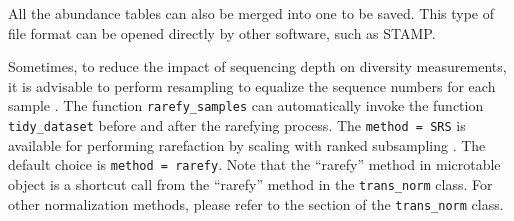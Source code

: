 \documentclass[
]{book}
\newenvironment{Shaded}{\begin{snugshade}}{\end{snugshade}}
\newcommand{\AttributeTok}[1]{\textcolor[rgb]{0.13,0.29,0.53}{#1}}
\newcommand{\CommentTok}[1]{\textcolor[rgb]{0.56,0.35,0.01}{\textit{#1}}}
\newcommand{\ConstantTok}[1]{\textcolor[rgb]{0.56,0.35,0.01}{#1}}
\newcommand{\FunctionTok}[1]{\textcolor[rgb]{0.13,0.29,0.53}{\textbf{#1}}}
\newcommand{\NormalTok}[1]{#1}
\newcommand{\OtherTok}[1]{\textcolor[rgb]{0.56,0.35,0.01}{#1}}
\newcommand{\SpecialCharTok}[1]{\textcolor[rgb]{0.81,0.36,0.00}{\textbf{#1}}}
\newcommand{\StringTok}[1]{\textcolor[rgb]{0.31,0.60,0.02}{#1}}
\begin{document}
All the abundance tables can also be merged into one to be saved.
This type of file format can be opened directly by other software, such as STAMP.

\begin{Shaded}
\end{Shaded}

Sometimes, to reduce the impact of sequencing depth on diversity measurements,
it is advisable to perform resampling to equalize the sequence numbers for each sample \citep{McKnight_Methodsnorm_2018}.
The function \texttt{rarefy\_samples} can automatically invoke the function \texttt{tidy\_dataset} before and after the rarefying process.
The \texttt{method\ =\ \textquotesingle{}SRS\textquotesingle{}} is available for performing rarefaction by scaling with ranked subsampling \citep{Beule_normalization_2020}.
The default choice is \texttt{method\ =\ \textquotesingle{}rarefy\textquotesingle{}}.
Note that the ``rarefy'' method in microtable object is a shortcut call from the ``rarefy'' method in the \texttt{trans\_norm} class.
For other normalization methods,
please refer to the section of the \texttt{trans\_norm} class.

\begin{Shaded}
\end{Shaded}
\end{document}
